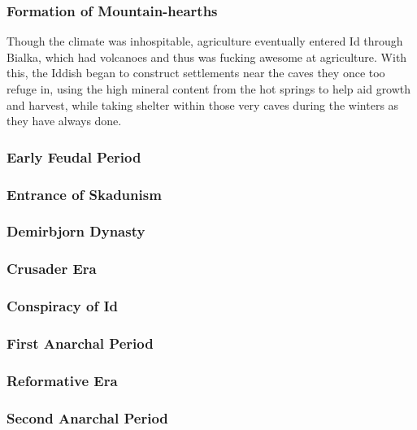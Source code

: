 \begin{multicols}{2}
		\subsubsection{Formation of Mountain-hearths}\par
			Though the climate was inhospitable, agriculture eventually entered Id through Bialka, which had volcanoes and thus was fucking awesome at agriculture. With this, the Iddish began to construct settlements near the caves they once too refuge in, using the high mineral content from the hot springs to help aid growth and harvest, while taking shelter within those very caves during the winters as they have always done.
		\subsubsection{Early Feudal Period}\par
		\subsubsection{Entrance of Skadunism}\par
		\subsubsection{Demirbjorn Dynasty}\par
		\subsubsection{Crusader Era}\par
		\subsubsection{Conspiracy of Id}\par
		\subsubsection{First Anarchal Period}\par
		\subsubsection{Reformative Era}\par
		\subsubsection{Second Anarchal Period}\par

\end{multicols}
